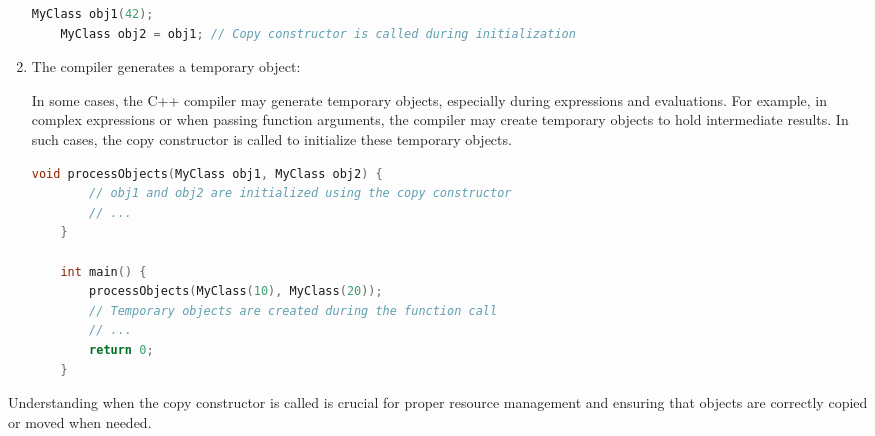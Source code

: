 \documentclass{article}
\begin{document}
\begin{enumerate}
    \begin{lstlisting}[language=C++]
    MyClass obj1(42);
    MyClass obj2 = obj1; // Copy constructor is called during initialization
    \end{lstlisting}

    \item The compiler generates a temporary object:
    
    In some cases, the C++ compiler may generate temporary objects, especially during expressions and evaluations.
    For example, in complex expressions or when passing function arguments, the compiler may create temporary objects to hold intermediate results. In such cases, the copy constructor is called to initialize these temporary objects.
    
    \begin{lstlisting}[language=C++]
    void processObjects(MyClass obj1, MyClass obj2) {
        // obj1 and obj2 are initialized using the copy constructor
        // ...
    }

    int main() {
        processObjects(MyClass(10), MyClass(20));
        // Temporary objects are created during the function call
        // ...
        return 0;
    }
    \end{lstlisting}

\end{enumerate}

Understanding when the copy constructor is called is crucial for proper resource management 
and ensuring that objects are correctly copied or moved when needed.
\end{document}
